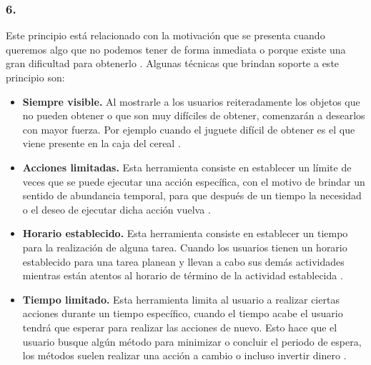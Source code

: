 \subsubsection{6. \principioVI} \label{subsec:principioVI}

 Este principio está relacionado con la motivación que se presenta cuando queremos algo
 que no podemos tener de forma inmediata  o porque existe una gran dificultad para obtenerlo
 \cite[p. 233]{Octalysis}. Algunas técnicas que brindan soporte a este principio son:

    \begin{itemize}
    \item
    {\bf Siempre visible.} %
        Al mostrarle a los usuarios reiteradamente los objetos que no pueden
        obtener o que son muy difíciles de obtener, comenzarán a desearlos con
        mayor fuerza. Por ejemplo cuando el juguete difícil de obtener es el
        que viene presente en la caja del cereal \cite[p. 252]{Octalysis}.

    \item
    {\bf Acciones limitadas.} %
        Esta herramienta consiste en establecer un límite de veces que se puede ejecutar una
        acción específica, con el motivo de brindar un sentido de abundancia temporal, para
        que después de un tiempo la necesidad o el deseo de ejecutar dicha acción vuelva
        \cite[p. 256]{Octalysis}.

    \item
    {\bf Horario establecido.} %
        Esta herramienta consiste en establecer un tiempo para la realización de
        alguna tarea. Cuando los usuarios tienen un horario establecido para una
        tarea planean y llevan a cabo sus demás actividades mientras están atentos
        al horario de término de la actividad establecida \cite[p. 258]{Octalysis}.

    \item
    {\bf Tiempo limitado.} %
        Esta herramienta limita al usuario a realizar ciertas acciones durante un tiempo
        específico, cuando el tiempo acabe el usuario tendrá que esperar para realizar las
        acciones de nuevo. Esto hace que el usuario busque algún método para minimizar o concluir
        el periodo de espera, los métodos suelen realizar una acción a cambio o incluso invertir
        dinero \cite[p. 261]{Octalysis}.
    \end{itemize}

